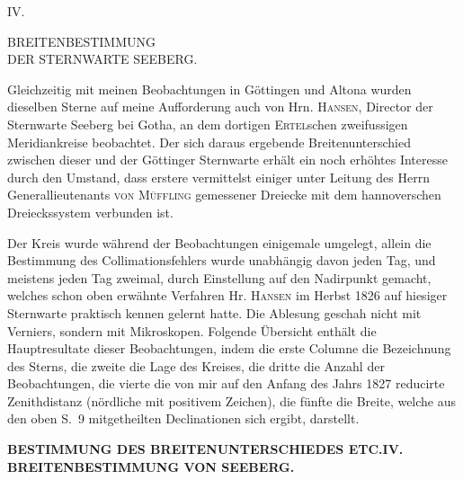 \begingroup
\setlength{\abovedisplayskip}{7pt}
\setlength{\belowdisplayskip}{7pt}
\setlength{\abovedisplayshortskip}{3pt}
\setlength{\belowdisplayshortskip}{4pt}

\par\clearpage

\vspace*{.19\textheight}
\begin{center}
{\large IV.}\par\medskip
{\Large BREITENBESTIMMUNG\\DER STERNWARTE SEEBERG.}
\end{center}

Gleichzeitig mit meinen Beobachtungen in Göttingen und Altona wurden
dieselben Sterne auf meine Aufforderung auch von Hrn. \textsc{Hansen}, Director der
Sternwarte Seeberg bei Gotha, an dem dortigen \textsc{Ertel}schen zweifussigen
Meridiankreise beobachtet. Der sich daraus ergebende Breitenunterschied zwischen
dieser und der Göttinger Sternwarte erhält ein noch erhöhtes Interesse durch
den Umstand, dass erstere vermittelst einiger unter Leitung des Herrn
Generallieutenants \textsc{von Müffling} gemessener Dreiecke mit dem hannoverschen
Dreieckssystem verbunden ist.

Der Kreis wurde während der Beobachtungen einigemale umgelegt, allein
die Bestimmung des Collimationsfehlers wurde unabhängig davon jeden Tag,
und meistens jeden Tag zweimal, durch Einstellung auf den Nadirpunkt gemacht,
welches schon oben erwähnte Verfahren Hr. \textsc{Hansen} im Herbst 1826
auf hiesiger Sternwarte praktisch kennen gelernt hatte. Die Ablesung geschah
nicht mit Verniers, sondern mit Mikroskopen. Folgende Übersicht enthält
die Hauptresultate dieser Beobachtungen, indem die erste Columne die
Bezeichnung des Sterns, die zweite die Lage des Kreises, die dritte die Anzahl
der Beobachtungen, die vierte die von mir auf den Anfang des Jahrs 1827
reducirte Zenithdistanz (nördliche mit positivem Zeichen), die fünfte die Breite,
welche aus den oben S.~9 mitgetheilten Declinationen sich ergibt, darstellt.

\par\clearpage
\noindent\makebox[12mm][l]{}\parbox[t]{\dimexpr\linewidth-24mm\relax}{\centering\scriptsize\bfseries BESTIMMUNG DES BREITENUNTERSCHIEDES ETC.\quad IV. BREITENBESTIMMUNG VON SEEBERG.}\par\medskip

